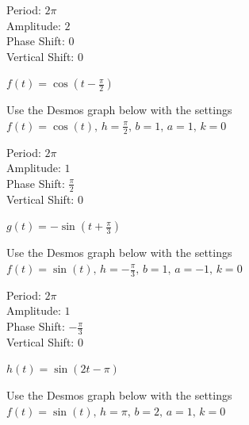 \documentclass{ximera}
\begin{document}
\begin{question}
\begin{problem}
\begin{solution}
Period: $2\pi$\\
Amplitude: $2$\\
Phase Shift: $0$\\
Vertical Shift: $0$\\
\end{solution}
\end{problem}

\begin{problem}
$f(t)  = \cos \left( t - \frac{\pi}{2} \right)$

\begin{solution}
Use the Desmos graph below with the settings $f(t)=\cos(t),\,h=\frac{\pi}{2},\,b=1,\,a=1,\,k=0$

\begin{center} 
\end{center}

Period: $2\pi$\\
Amplitude: $1$\\
Phase Shift: $\frac{\pi}{2}$\\
Vertical Shift: $0$\\
\end{solution}
\end{problem}

\begin{problem}
$g(t)  = -\sin \left( t + \frac{\pi}{3} \right)$

\begin{solution}
Use the Desmos graph below with the settings $f(t)=\sin(t),\,h=-\frac{\pi}{3},\,b=1,\,a=-1,\,k=0$

\begin{center} 
\end{center}

Period: $2\pi$\\
Amplitude: $1$\\
Phase Shift: $-\frac{\pi}{3}$\\
Vertical Shift: $0$\\
\end{solution}
\end{problem}

\begin{problem}
$h(t) = \sin(2t - \pi)$

\begin{solution}
Use the Desmos graph below with the settings $f(t)=\sin(t),\,h=\pi,\,b=2,\,a=1,\,k=0$

\begin{center} 
\end{center}


\end{solution}
\end{problem}
\end{question}
\end{document}
